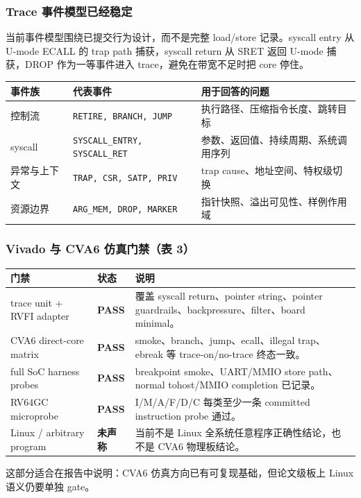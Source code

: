 \documentclass[aspectratio=169,10pt]{beamer}
\newcommand{\tagok}[1]{\textcolor{rvgreen}{\textbf{#1}}}
\newcommand{\tagwarn}[1]{\textcolor{rvorange}{\textbf{#1}}}
\begin{document}
\begin{frame}
  \frametitle{Trace 事件模型已经稳定}
  \vskip0.1cm

  当前事件模型围绕\alert{已提交行为}设计，而不是完整 load/store 记录。syscall entry 从 U-mode ECALL 的 trap path 捕获，syscall return 从 SRET 返回 U-mode 捕获，DROP 作为一等事件进入 trace，避免在带宽不足时把 core 停住。

  \vskip0.22cm
  \begin{center}\scriptsize
  \setlength{\tabcolsep}{5pt}
  \begin{tabular}{@{}lll@{}}
    \toprule
    \textbf{事件族} & \textbf{代表事件} & \textbf{用于回答的问题} \\
    \midrule
    控制流 & \texttt{RETIRE, BRANCH, JUMP} & 执行路径、压缩指令长度、跳转目标 \\
    syscall & \texttt{SYSCALL\_ENTRY, SYSCALL\_RET} & 参数、返回值、持续周期、系统调用序列 \\
    异常与上下文 & \texttt{TRAP, CSR, SATP, PRIV} & trap cause、地址空间、特权级切换 \\
    资源边界 & \texttt{ARG\_MEM, DROP, MARKER} & 指针快照、溢出可见性、样例作用域 \\
    \bottomrule
  \end{tabular}
  \end{center}

  \vskip0.18cm
\end{frame}

\begin{frame}
  \frametitle{Vivado 与 CVA6 仿真门禁（表 3）}
  \vskip0.1cm
  \begin{center}\scriptsize
  \renewcommand{\arraystretch}{1.20}
  \begin{tabularx}{0.96\linewidth}{@{}L{3.15cm}L{1.35cm}Y@{}}
    \toprule
    \textbf{门禁} & \textbf{状态} & \textbf{说明} \\
    \midrule
    trace unit + RVFI adapter & \tagok{PASS} & 覆盖 syscall return、pointer string、pointer guardrails、backpressure、filter、board minimal。 \\
    CVA6 direct-core matrix & \tagok{PASS} & smoke、branch、jump、ecall、illegal trap、ebreak 等 trace-on/no-trace 终态一致。 \\
    full SoC harness probes & \tagok{PASS} & breakpoint smoke、UART/MMIO store path、normal tohost/MMIO completion 已记录。 \\
    RV64GC microprobe & \tagok{PASS} & I/M/A/F/D/C 每类至少一条 committed instruction probe 通过。 \\
    Linux / arbitrary program & \tagwarn{未声称} & 当前不是 Linux 全系统任意程序正确性结论，也不是 CVA6 物理板结论。 \\
    \bottomrule
  \end{tabularx}
  \end{center}

  \vskip0.1cm
  \small
  这部分适合在报告中说明：CVA6 仿真方向已有可复现基础，但论文级板上 Linux 语义仍要单独 gate。
\end{frame}
\end{document}
